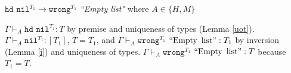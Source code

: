 \begin{case}
$\mathtt{hd}$ $\mathtt{nil}^{T_{1}}\rightarrow\mathtt{wrong}^{T_{1}}$ \emph{``Empty list"} where $A\in\lbrace H,M\rbrace$

$\Gamma\vdash_{A}\mathtt{hd}$ $\mathtt{nil}^{T_{1}}:T$ by premise and uniqueness of types (Lemma \ref{uot}).  $\Gamma\vdash_{A}\mathtt{nil}^{T_{1}}:[T_{1}]$, $T=T_{1}$, and $\Gamma\vdash_{A}\mathtt{wrong}^{T_{1}}$ $\mathrm{``Empty}$ $\mathrm{list"}:T_{1}$ by inversion (Lemma \ref{i}) and uniqueness of types.  $\Gamma\vdash_{A}\mathtt{wrong}^{T_{1}}$ $\mathrm{``Empty}$ $\mathrm{list"}:T$ because $T_{1}=T$.
\end{case}